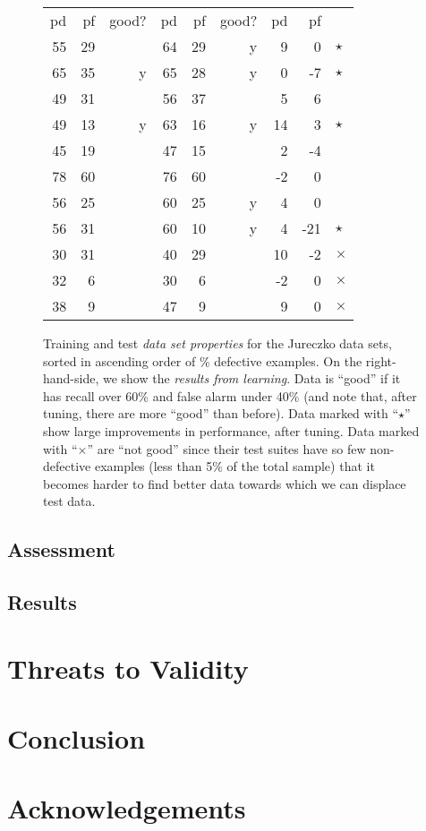 \documentclass{sig-alternate}
\begin{document}
\begin{figure*}[!t]
\begin{center}
\begin{minipage}{.4\linewidth}
\begin{tabular}{|rrr|rrr|rr|l}
				pd & pf & good? & pd & pf & good? & pd & pf\\\cline{1-8}
				55 & 29 &   & 64 & 29 & y & 9 & 0&$\star$\\
				65 & 35 & y & 65 & 28 & y & 0 & -7&$\star$\\
				49 & 31 &   & 56 & 37 &   & 5 & 6\\
				49 & 13 & y & 63 & 16 & y & 14 & 3&$\star$\\
				45 & 19 &   & 47 & 15 &   & 2 & -4\\
				78 & 60 &   & 76 & 60 &   & -2 & 0\\
				56 & 25 &   & 60 & 25 & y & 4 & 0\\
				56 & 31 &   & 60 & 10 & y & 4 & -21&$\star$\\
				30 & 31 &   & 40 & 29 &   & 10 & -2&$\times$\\
				32 & 6 &   & 30 & 6 &   & -2 & 0&$\times$\\
				38 & 9 &   & 47 & 9 &   & 9 & 0&$\times$\\
				\hline 
			\end{tabular}
			
		\end{minipage}
	\end{center}    
	
	\caption{Training and test {\em data set properties} for the Jureczko data sets,
		sorted in ascending order of \% defective examples.
		On the right-hand-side, we show the {\em results from learning}.
		Data is ``good'' if it has recall over 60\% and false alarm under 40\%
		(and note that, after tuning, there are more ``good'' than before).
		Data   marked with ``$\star$'' show large improvements in performance, after tuning.
		Data   marked with ``$\times$'' are ``not good'' since their test suites  have so few non-defective examples (less than 5\% of the total sample) that it becomes harder to find better data towards which we can displace test data.
	}\label{fig:j}
\end{figure*}


\subsection{Assessment}
\subsection{Results}

\section{Threats to Validity}
\section{Conclusion}
\section*{Acknowledgements}



\end{document}
